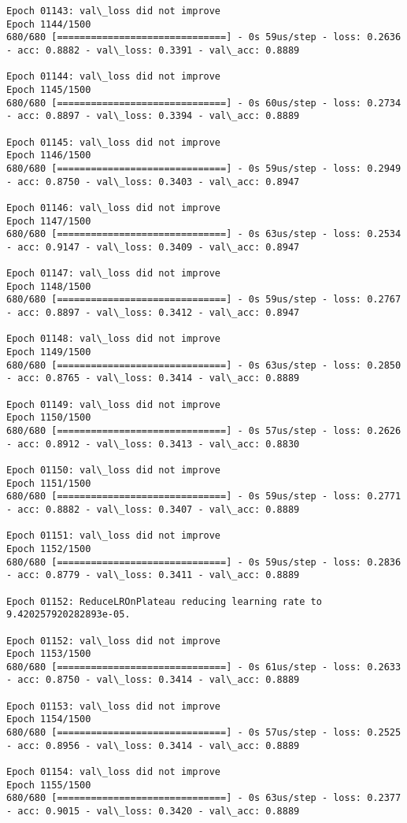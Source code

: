 \documentclass[11pt]{article}
\begin{document}
\begin{Verbatim}[commandchars=\\\{\}]
Epoch 01143: val\_loss did not improve
Epoch 1144/1500
680/680 [==============================] - 0s 59us/step - loss: 0.2636 - acc: 0.8882 - val\_loss: 0.3391 - val\_acc: 0.8889

Epoch 01144: val\_loss did not improve
Epoch 1145/1500
680/680 [==============================] - 0s 60us/step - loss: 0.2734 - acc: 0.8897 - val\_loss: 0.3394 - val\_acc: 0.8889

Epoch 01145: val\_loss did not improve
Epoch 1146/1500
680/680 [==============================] - 0s 59us/step - loss: 0.2949 - acc: 0.8750 - val\_loss: 0.3403 - val\_acc: 0.8947

Epoch 01146: val\_loss did not improve
Epoch 1147/1500
680/680 [==============================] - 0s 63us/step - loss: 0.2534 - acc: 0.9147 - val\_loss: 0.3409 - val\_acc: 0.8947

Epoch 01147: val\_loss did not improve
Epoch 1148/1500
680/680 [==============================] - 0s 59us/step - loss: 0.2767 - acc: 0.8897 - val\_loss: 0.3412 - val\_acc: 0.8947

Epoch 01148: val\_loss did not improve
Epoch 1149/1500
680/680 [==============================] - 0s 63us/step - loss: 0.2850 - acc: 0.8765 - val\_loss: 0.3414 - val\_acc: 0.8889

Epoch 01149: val\_loss did not improve
Epoch 1150/1500
680/680 [==============================] - 0s 57us/step - loss: 0.2626 - acc: 0.8912 - val\_loss: 0.3413 - val\_acc: 0.8830

Epoch 01150: val\_loss did not improve
Epoch 1151/1500
680/680 [==============================] - 0s 59us/step - loss: 0.2771 - acc: 0.8882 - val\_loss: 0.3407 - val\_acc: 0.8889

Epoch 01151: val\_loss did not improve
Epoch 1152/1500
680/680 [==============================] - 0s 59us/step - loss: 0.2836 - acc: 0.8779 - val\_loss: 0.3411 - val\_acc: 0.8889

Epoch 01152: ReduceLROnPlateau reducing learning rate to 9.420257920282893e-05.

Epoch 01152: val\_loss did not improve
Epoch 1153/1500
680/680 [==============================] - 0s 61us/step - loss: 0.2633 - acc: 0.8750 - val\_loss: 0.3414 - val\_acc: 0.8889

Epoch 01153: val\_loss did not improve
Epoch 1154/1500
680/680 [==============================] - 0s 57us/step - loss: 0.2525 - acc: 0.8956 - val\_loss: 0.3414 - val\_acc: 0.8889

Epoch 01154: val\_loss did not improve
Epoch 1155/1500
680/680 [==============================] - 0s 63us/step - loss: 0.2377 - acc: 0.9015 - val\_loss: 0.3420 - val\_acc: 0.8889


\end{Verbatim}
\end{document}
